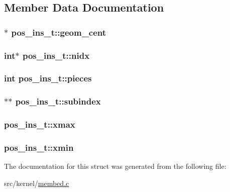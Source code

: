 \subsection{\-Member \-Data \-Documentation}
\hypertarget{structpos__ins__t_a7dc60d23a2a0ce5e776b969bd4a6a154}{
\subsubsection[{geom\-\_\-cent}]{$\ast$ {\bf pos\-\_\-ins\-\_\-t\-::geom\-\_\-cent}}}\label{structpos__ins__t_a7dc60d23a2a0ce5e776b969bd4a6a154}
\hypertarget{structpos__ins__t_a86a94661b5b710fa85319f624d5e182e}{
\subsubsection[{nidx}]{\setlength{\rightskip}{0pt plus 5cm}int$\ast$ {\bf pos\-\_\-ins\-\_\-t\-::nidx}}}\label{structpos__ins__t_a86a94661b5b710fa85319f624d5e182e}
\hypertarget{structpos__ins__t_a55ff0e007a435c210df853b154f2dc39}{
\subsubsection[{pieces}]{\setlength{\rightskip}{0pt plus 5cm}int {\bf pos\-\_\-ins\-\_\-t\-::pieces}}}\label{structpos__ins__t_a55ff0e007a435c210df853b154f2dc39}
\hypertarget{structpos__ins__t_abc5522bdd757fdbe28cdf850138756ad}{
\subsubsection[{subindex}]{$\ast$$\ast$ {\bf pos\-\_\-ins\-\_\-t\-::subindex}}}\label{structpos__ins__t_abc5522bdd757fdbe28cdf850138756ad}
\hypertarget{structpos__ins__t_a458537cc9551a13971464b671b2d1e86}{
\subsubsection[{xmax}]{ {\bf pos\-\_\-ins\-\_\-t\-::xmax}}}\label{structpos__ins__t_a458537cc9551a13971464b671b2d1e86}
\hypertarget{structpos__ins__t_a07c346b4b6085b13812cae583f90998b}{
\subsubsection[{xmin}]{ {\bf pos\-\_\-ins\-\_\-t\-::xmin}}}\label{structpos__ins__t_a07c346b4b6085b13812cae583f90998b}


\-The documentation for this struct was generated from the following file\-:\begin{DoxyCompactItemize}
\item 
src/kernel/\hyperlink{membed_8c}{membed.\-c}\end{DoxyCompactItemize}
